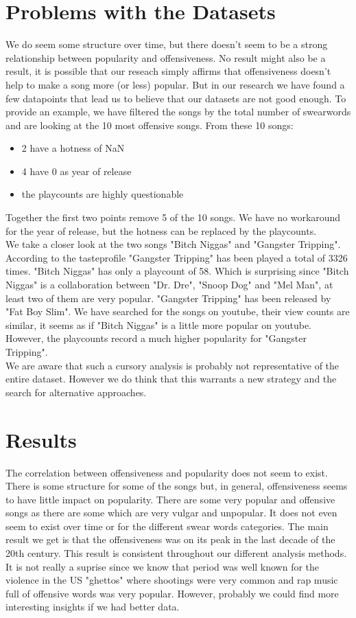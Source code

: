 \documentclass[11pt]{article}
\begin{document}
\section{Problems with the Datasets}
We do seem some structure over time, but there doesn't seem to be a strong relationship between popularity and offensiveness.
No result might also be a result, it is possible that our reseach simply affirms that offensiveness doesn't help to make a song more (or less) popular.
But in our research we have found a few datapoints that lead us to believe that our datasets are not good enough.
To provide an example, we have filtered the songs by the total number of swearwords and are looking at the 10 most offensive songs.
From these 10 songs:
\begin{itemize}
  \item 2 have a hotness of NaN
  \item 4 have 0 as year of release
  \item the playcounts are highly questionable
\end{itemize}
Together the first two points remove 5 of the 10 songs. We have no workaround for the year of release, but the hotness can be replaced by the playcounts.\\
We take a closer look at the two songs "Bitch Niggas" and "Gangster Tripping". According to the tasteprofile "Gangster Tripping" has been played a total of 3326 times.
"Bitch Niggas" has only a playcount of 58. Which is surprising since "Bitch Niggas" is a collaboration between "Dr. Dre", "Snoop Dog" and "Mel Man", at least two of them are very popular.
"Gangster Tripping" has been released by "Fat Boy Slim". We have searched for the songs on youtube, their view counts are similar, it seems as if "Bitch Niggas" is a little more popular on youtube.
However, the playcounts record a much higher popularity for "Gangster Tripping".\\
We are aware that such a cursory analysis is probably not representative of the entire dataset.
However we do think that this warrants a new strategy and the search for alternative approaches.

\section{Results}
The correlation between offensiveness and popularity does not seem to exist. There is some structure for some of the songs but, in general, offensiveness seems to have little impact on popularity. There are some very popular and offensive songs as there are some which are very vulgar and unpopular. It does not even seem to exist over time or for the different swear words categories. The main result we get is that the offensiveness was on its peak in the last decade of the 20th century. This result is consistent throughout our different analysis methods. It is not really a suprise since we know that period was well known for the violence in the US "ghettos" where shootings were very common and rap music full of offensive words was very popular. However, probably we could find more interesting insights if we had better data.
\end{document}
